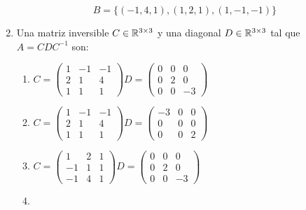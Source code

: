 \documentclass[../practica.root.tex]{subfiles}
\begin{document}
\begin{enumerate}
          \[ \boxed{B = \{ (-1,4,1),(1,2,1),(1,-1,-1) \}} \]
    \item Una matriz inversible $ C \in \mathbb{R}^{3\times3} $ y una diagonal $ D \in \mathbb{R}^{3\times3} $ tal que $ A = CDC^{-1} $ son:
          \begin{enumerate}
              \item $ C = \begin{pmatrix}
                        1 & -1 & -1 \\
                        2 & 1  & 4  \\
                        1 & 1  & 1
                    \end{pmatrix}
                    D = \begin{pmatrix}
                        0 & 0 & 0  \\
                        0 & 2 & 0  \\
                        0 & 0 & -3
                    \end{pmatrix} $
              \item $ C = \begin{pmatrix}
                        1 & -1 & -1 \\
                        2 & 1  & 4  \\
                        1 & 1  & 1
                    \end{pmatrix}
                    D = \begin{pmatrix}
                        -3 & 0 & 0 \\
                        0  & 0 & 0 \\
                        0  & 0 & 2
                    \end{pmatrix} $
              \item $ C = \begin{pmatrix}
                        1  & 2 & 1 \\
                        -1 & 1 & 1 \\
                        -1 & 4 & 1
                    \end{pmatrix}
                    D = \begin{pmatrix}
                        0 & 0 & 0  \\
                        0 & 2 & 0  \\
                        0 & 0 & -3
                    \end{pmatrix} $
              \item {}
\end{enumerate}
\end{enumerate}
\end{document}
